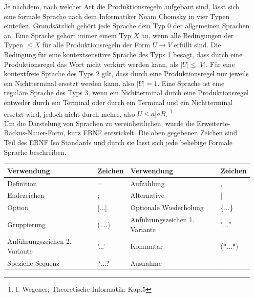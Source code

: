 \documentclass[12pt, a4paper]{scrartcl}
\begin{document}
Je nachdem, nach welcher Art die Produktionsregeln aufgebaut sind, lässt sich eine formale Sprache nach dem Informatiker Noam Chomsky in vier Typen einteilen. Grundsätzlich gehört jede Sprache dem Typ 0 der allgemeinen Sprachen an. Eine Sprache gehört immer einem Typ $X$ an, wenn alle Bedingungen  der Typen $\leq X$ für alle Produktionsregeln der Form $U \rightarrow V$ erfüllt sind. Die Bedingung für eine kontextsensitive Sprache des Typs 1 besagt, dass durch eine Produktionsregel das Wort nicht verkürt werden kann, als $|U| \leq |V|$. Für eine kontextfreie Sprache des Typs 2 gilt, dass durch eine Produktionsregel nur jeweils ein Nichtterminal ersetzt werden kann, also $|U| = 1$. Eine Sprache ist eine reguläre Sprache des Typs 3, wenn ein Nichtterminal durch eine Produktionsregel entweder durch ein Terminal oder durch ein Terminal und ein Nichtterminal ersetzt wird, jedoch nicht durch mehre, also $U \leq a|aB$. \footnote{I. Wegener;	Theoretische Informatik; Kap.5}\\
Um die Darstelung von Sprachen zu vereinheitlichen, wurde die Erweiterte-Backus-Nauer-Form, kurz EBNF entwickelt. Die oben gegebenen Zeichen sind Teil des EBNF Iso Standards und durch sie lässt sich jede beliebige Formale Sprache beschreiben.\\
\begin{table}[]
\begin{tabular}{|ll|ll|}
\hline
Verwendung                    & Zeichen   & Verwendung                    & Zeichen \\ \hline
Definition                    & =         & Aufzählung                    & ,       \\
Endezeichen                   & ;         & Alternative                   & |       \\
Option                        & {[}...{]} & Optionale Wiederholung        & \{...\} \\
Gruppierung                   & (....)    & Anführungszeichen 1. Variante & "..."   \\
Anführungszeichen 2. Variante & '...'     & Kommntar                      & (*...*) \\
Spezielle Sequenz             & ?...?     & Ausnahme                      & -       \\ \hline
\end{tabular}
\end{table}
 
\end{document}
